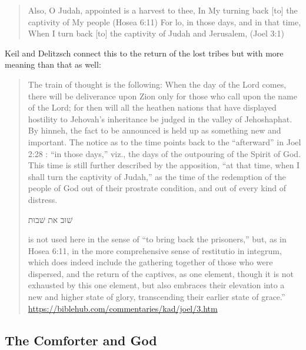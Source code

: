 \documentclass[11pt]{article}
\begin{document}
\begin{quote}
Also, O Judah, appointed is a harvest to thee, In My turning back [to] the captivity of My people (Hosea 6:11)
For lo, in those days, and in that time, When I turn back [to] the captivity of Judah and Jerusalem, (Joel 3:1)
\end{quote}
Keil and Delitzsch connect this to the return of the lost tribes but with more meaning than that as well:
\begin{quote}
The train of thought is the following: When the day of the Lord comes, there will be deliverance upon Zion only for those who call upon the name of the Lord; for then will all the heathen nations that have displayed hostility to Jehovah’s inheritance be judged in the valley of Jehoshaphat. By hinneh, the fact to be announced is held up as something new and important. The notice as to the time points back to the “afterward” in Joel 2:28 : “in those days,” viz., the days of the outpouring of the Spirit of God. This time is still further described by the apposition, “at that time, when I shall turn the captivity of Judah,” as the time of the redemption of the people of God out of their prostrate condition, and out of every kind of distress. \begin{hebrew} שׁוּב את שׁבוּת \end{hebrew} is not used here in the sense of “to bring back the prisoners,” but, as in Hosea 6:11, in the more comprehensive sense of restitutio in integrum, which does indeed include the gathering together of those who were dispersed, and the return of the captives, as one element, though it is not exhausted by this one element, but also embraces their elevation into a new and higher state of glory, transcending their earlier state of grace.”
\url{https://biblehub.com/commentaries/kad/joel/3.htm}
\end{quote}

\subsection{The Comforter and God} \label{the comforter and god}
\end{document}
